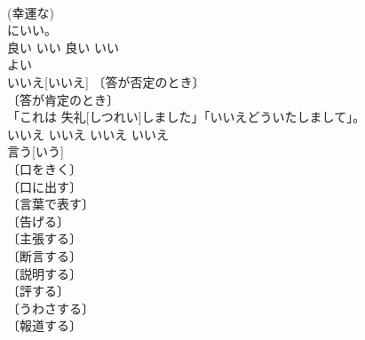 \documentclass[8pt]{extreport}
\begin{document}
\begin{CJK}{UTF8}{min}
\\	(幸運な) 
\\	[⇒よい３ 
\\	〔適当〕 (適当な) 
\\	(効果的な) 
\\	(好適な) 
\\	(快適な) 
\\	(好都合な) 
\\	(有益な) 
\\	(望ましい) 
\\	(好ましい) 
\\	[⇒よい３ 
\\	〔(「…でいい」などの形で) 許容・満足〕 [⇒よい３ 
\\	〔(「…していい」などの形で) 賛成・承認・許可〕 
\\	〔(「もういい」などの形で) 十分・不要の意を示して〕 
\\	〔(「…だといい・すればいい・した方がいい」などの形で) 願望・勧誘〕 [⇒よい３ 
\\	〔(「…していいな」などの形で) 賛嘆・羨望〕 
\\	〔(「…よりいい・…の方がいい」などの形で) 比較的まし〕 [⇒よい３ 
\\	〔反語〕 
\\	〔念押し〕 ⇒いいか, いいかい, いいこと 
\\	いいね２. 
\\	〔(動詞について) …しやすい〕 
\\	[⇒よい３ 
\\	非常[ひじょう]にいい。	
\\	良い	いい	良い	いい 
\\	よい	
\\	いいえ[いいえ]	〔答が否定のとき〕 
\\	〔答が肯定のとき〕 
\\	「これは 失礼[しつれい]しました」「いいえどういたしまして」。	
\\	いいえ	いいえ	いいえ	いいえ	
\\	言う[いう]	
\\	〔口をきく〕 
\\	〔口に出す〕 
\\	〔言葉で表す〕 
\\	〔告げる〕 
\\	〔主張する〕 
\\	〔断言する〕 
\\	〔説明する〕 
\\	〔評する〕 
\\	〔うわさする〕 
\\	〔報道する〕 

\end{CJK}
\end{document}
